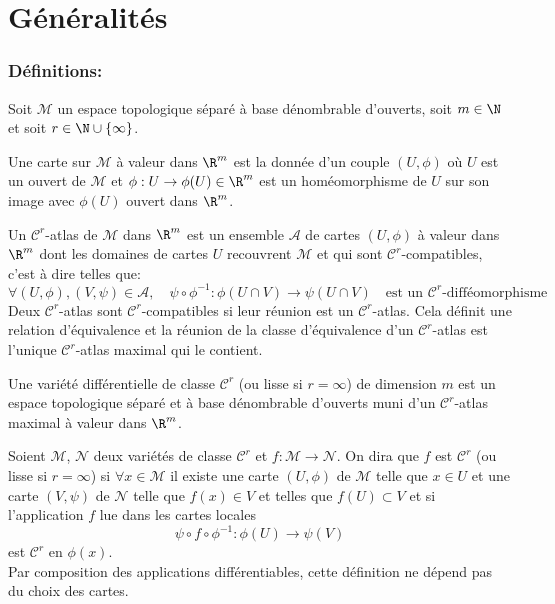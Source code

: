\section{Généralités}

\subsubsection{Définitions:}

Soit $\mathcal{M}$ un espace topologique séparé à base dénombrable d'ouverts, soit $m\in \N$ et soit $r\in \N \cup \{\infty\}$.

\begin{defi}[Carte]
Une carte sur $\mathcal{M}$ à valeur dans $\R ^m$ est la donnée d'un couple $(U, \phi)$ où $U$ est un ouvert de $\mathcal{M}$ et $\phi : U \to \phi(U) \in \R^m$ est un homéomorphisme de $U$ sur son image avec $\phi(U)$ ouvert dans $\R^m$.
\end{defi}

\begin{defi}[Atlas]
Un $\mathscr{C}^r$-atlas de $\mathcal{M}$ dans $\R^m$ est un ensemble $\mathscr{A}$ de cartes $(U, \phi)$ à valeur dans $\R^m$ dont les domaines de cartes $U$ recouvrent $\mathcal{M}$ et qui sont $\mathscr{C}^r$-compatibles, c'est à dire telles que:
$$\forall (U, \phi), (V, \psi) \in \mathscr{A}, \quad \psi \circ \phi ^{-1} : \phi(U\cap V) \to \psi(U \cap V) \quad \text{est un }\mathscr{C}^r\text{-difféomorphisme}$$
Deux $\mathscr{C}^r$-atlas sont $\mathscr{C}^r$-compatibles si leur réunion est un $\mathscr{C}^r$-atlas. Cela définit une relation d'équivalence et la réunion de la classe d'équivalence d'un $\mathscr{C}^r$-atlas est l'unique $\mathscr{C}^r$-atlas maximal qui le contient.
\end{defi}

\begin{defi}
Une variété différentielle de classe $\mathscr{C}^r$ (ou lisse si $r = \infty$) de dimension $m$ est un espace topologique séparé et à base dénombrable d'ouverts muni d'un $\mathscr{C}^r$-atlas maximal à valeur dans $\R^m$.
\end{defi}

\begin{defi}
Soient $\mathcal{M}$, $\mathcal{N}$ deux variétés de classe $\mathscr{C}^r$ et $f: \mathcal{M} \to \mathcal{N}$. On dira que $f$ est $\mathscr{C}^r$ (ou lisse si $r = \infty$) si $\forall x\in \mathcal{M}$ il existe une carte $(U, \phi)$ de $\mathcal{M}$ telle que $x\in U$ et une carte $(V, \psi)$ de $\mathcal{N}$ telle que $f(x) \in V$ et telles que $f(U)\subset V$ et si l'application $f$ lue dans les cartes locales 
$$\psi \circ f \circ \phi^{-1}:\phi(U)\to \psi(V)$$
est $\mathscr{C}^r$ en $\phi(x)$. \\
Par composition des applications différentiables, cette définition ne dépend pas du choix des cartes.
\end{defi}


